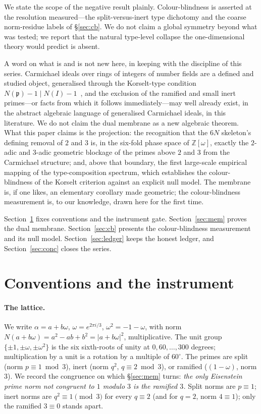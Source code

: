 \documentclass[11pt]{article}
\begin{document}
We state the scope of the negative result plainly. Colour-blindness is asserted at the resolution
measured---the split-versus-inert type dichotomy and the coarse norm-residue labels of \S\ref{sec:cb}.
We do not claim a global symmetry beyond what was tested; we report that the natural type-level
collapse the one-dimensional theory would predict is absent.

A word on what is and is not new here, in keeping with the discipline of this series. Carmichael
ideals over rings of integers of number fields are a defined and studied object, generalised through
the Korselt-type condition $N(\mathfrak{p})-1\mid N(I)-1$~\cite{Steele2008,Bae2023}, and the exclusion
of the ramified and small inert primes---or facts from which it follows immediately---may well already
exist, in the abstract algebraic language of generalised Carmichael ideals, in this literature. We do
not claim the dual membrane as a new algebraic theorem. What this paper claims is the projection: the
recognition that the $6N$ skeleton's defining removal of $2$ and $3$ is, in the six-fold phase space
of $\mathbb{Z}[\omega]$, exactly the $2$-adic and $3$-adic geometric blockage of the primes above $2$
and $3$ from the Carmichael structure; and, above that boundary, the first large-scale empirical
mapping of the type-composition spectrum, which establishes the colour-blindness of the Korselt
criterion against an explicit null model. The membrane is, if one likes, an elementary corollary made
geometric; the colour-blindness measurement is, to our knowledge, drawn here for the first time.

Section~\ref{sec:inst} fixes conventions
and the instrument gate. Section~\ref{sec:mem} proves the dual membrane. Section~\ref{sec:cb} presents
the colour-blindness measurement and its null model. Section~\ref{sec:ledger} keeps the honest ledger,
and Section~\ref{sec:conc} closes the series.

\section{Conventions and the instrument}\label{sec:inst}
\paragraph{The lattice.}
We write $\alpha=a+b\omega$, $\omega=e^{2\pi i/3}$, $\omega^2=-1-\omega$, with norm
$N(a+b\omega)=a^2-ab+b^2=|a+b\omega|^2$, multiplicative. The unit group $\{\pm1,\pm\omega,\pm\omega^2\}$
is the six sixth-roots of unity at $0,60,\dots,300$ degrees; multiplication by a unit is a rotation by
a multiple of $60^\circ$. The primes are split (norm $p\equiv1\bmod3$), inert (norm $q^2$,
$q\equiv2\bmod3$), or ramified ($(1-\omega)$, norm $3$). We record the congruence on which
\S\ref{sec:mem} turns: \emph{the only Eisenstein prime norm not congruent to $1$ modulo $3$ is the
ramified $3$.} Split norms are $p\equiv1$; inert norms are $q^2\equiv1\pmod3$ for every $q\equiv2$
(and for $q=2$, norm $4\equiv1$); only the ramified $3\equiv0$ stands apart.
\end{document}
